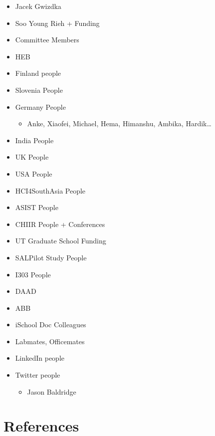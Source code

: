 \documentclass[letterpaper, nobind]{templates/ociamthesis}
\providecommand{\tightlist}{%
  \setlength{\itemsep}{0pt}\setlength{\parskip}{0pt}}
\begin{document}
\begin{itemize}
\tightlist
\item
  Jacek Gwizdka
\item
  Soo Young Rieh + Funding
\item
  Committee Members
\item
  HEB
\item
  Finland people
\item
  Slovenia People
\item
  Germany People

  \begin{itemize}
  \tightlist
  \item
    Anke, Xiaofei, Michael, Hema, Himanshu, Ambika, Hardik\ldots{}
  \end{itemize}
\item
  India People
\item
  UK People
\item
  USA People
\item
  HCI4SouthAsia People
\item
  ASIST People
\item
  CHIIR People + Conferences
\item
  UT Graduate School Funding
\item
  SALPilot Study People
\item
  I303 People
\item
  DAAD
\item
  ABB
\item
  iSchool Doc Colleagues
\item
  Labmates, Officemates
\item
  LinkedIn people
\item
  Twitter people

  \begin{itemize}
  \tightlist
  \item
    Jason Baldridge
  \end{itemize}
\end{itemize}

\hypertarget{references}{%
\chapter*{References}\label{references}}

\end{document}
